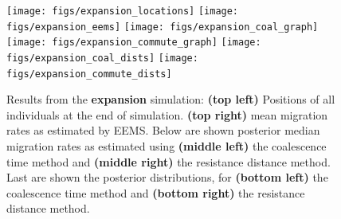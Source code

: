 \documentclass{article}
\begin{document}
\begin{figure}
\centering
    \texttt{[image: figs/expansion\_locations]}
    \texttt{[image: figs/expansion\_eems]}
    \texttt{[image: figs/expansion\_coal\_graph]}
    \texttt{[image: figs/expansion\_commute\_graph]}
    \texttt{[image: figs/expansion\_coal\_dists]}
    \texttt{[image: figs/expansion\_commute\_dists]}
    \caption{
        Results from the \textbf{expansion} simulation:
        \textbf{(top left)} Positions of all individuals at the end of simulation.
        \textbf{(top right)} mean migration rates as estimated by EEMS.
        Below are shown
        posterior median migration rates 
            as estimated using 
            \textbf{(middle left)} the coalescence time method and
            \textbf{(middle right)} the resistance distance method.
        Last are shown the posterior distributions, for
            \textbf{(bottom left)} the coalescence time method and
            \textbf{(bottom right)} the resistance distance method.
        \label{sfig:expansion_results}
    }
\end{figure}
\end{document}
